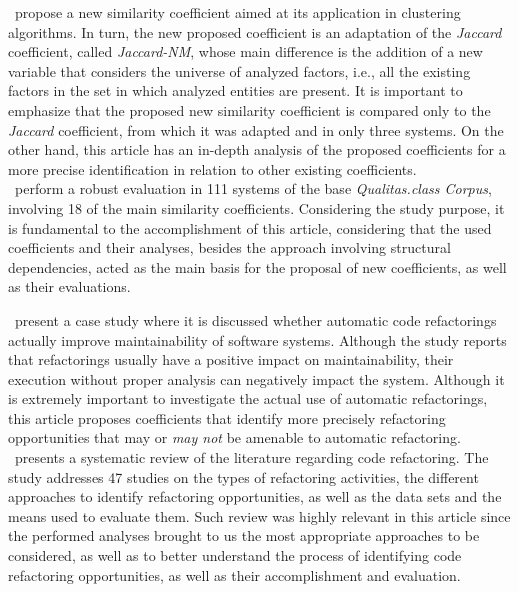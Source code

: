 \documentclass[smallextended,natbib]{svjour3}
\begin{document}
{ \citet{Naseem2010}~propose a new similarity coefficient aimed at its application in clustering algorithms. In turn, the new proposed coefficient is an adaptation of the \textit{Jaccard} coefficient, called \textit{Jaccard-NM}, whose main difference is the addition of a new variable that considers the universe of analyzed factors, i.e., all the existing factors in the set in which analyzed entities are present. It is important to emphasize that the proposed new similarity coefficient is compared only to the \textit{Jaccard} coefficient, from which it was adapted and in only three systems. On the other hand, this article has an in-depth analysis of the proposed coefficients for a more precise identification in relation to other existing coefficients.\\[-0.2cm]

 \citet{2013_seke}~perform a robust evaluation in 111 systems of the base \textit{Qualitas.class Corpus}, involving 18 of the main similarity coefficients. Considering the study purpose, it is fundamental to the accomplishment of this article, considering that the used coefficients and their analyses, besides the approach involving structural dependencies, acted as the main basis for the proposal of new coefficients, as well as their evaluations.

{\citet{szHoke2015automatic}~present a case study where it is discussed whether automatic code refactorings actually improve maintainability of software systems. %
Although the study reports that refactorings usually have a positive impact on maintainability, their execution without proper analysis can negatively impact the system. Although it is extremely important to investigate the actual use of automatic refactorings, this article proposes coefficients that identify more precisely refactoring opportunities that may or {\em may not} be amenable to automatic refactoring.}\\[-0.2cm]

 \citet{AlDallal2015231}~presents a systematic review of the literature regarding code refactoring. The study addresses 47 studies on the types of refactoring activities, the different approaches to identify refactoring opportunities, as well as the data sets and the means used to evaluate them. Such review was highly relevant in this article since the performed analyses brought to us the most appropriate approaches to be considered, as well as to better understand the process of identifying code refactoring opportunities, as well as their accomplishment and evaluation.\\[-0.2cm]

}
\end{document}
